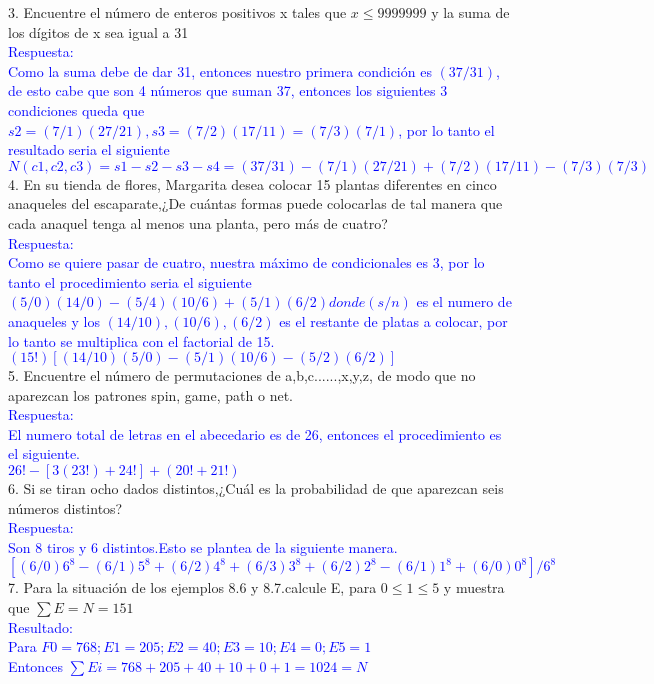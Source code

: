 \documentclass{article}
\begin{document}
3. Encuentre el número de enteros positivos x tales que $x\leq 9999999$ y la suma de los dígitos de x sea igual a 31\\
\textcolor{blue}{ Respuesta:\\Como la suma debe de dar 31, entonces nuestro primera condición es $(37/31)$, de esto cabe que son 4 números que suman 37, entonces los siguientes 3 condiciones queda que $s2=(7/1)(27/21), s3=(7/2)(17/11)=(7/3)(7/1)$, por lo tanto el resultado seria el siguiente\\$N(c1,c2,c3)=s1-s2-s3-s4=(37/31)-(7/1)(27/21)+(7/2)(17/11)-(7/3)(7/3)$
}
\\
4. En su tienda de flores, Margarita desea colocar 15 plantas diferentes en cinco anaqueles del escaparate,¿De cuántas formas puede colocarlas de tal manera que cada anaquel tenga al menos una planta, pero más de cuatro?\\
\textcolor{blue}{Respuesta:\\Como se quiere pasar de cuatro, nuestra máximo de condicionales es 3, por lo tanto el procedimiento seria el siguiente\\
$(5/0)(14/0)-(5/4)(10/6)+(5/1)(6/2) donde (s/n)$ es el numero de anaqueles y los $(14/10),(10/6),(6/2)$ es el restante de platas a colocar, por lo tanto se multiplica con el factorial de 15.\\$(15!)[(14/10)(5/0)-(5/1)(10/6)-(5/2)(6/2)]$
}
\\
5. Encuentre el número de permutaciones de a,b,c......,x,y,z, de modo que no aparezcan los patrones spin, game, path o net.\\
\textcolor{blue}{Respuesta:\\El numero total de letras en el abecedario es de 26, entonces el procedimiento es el siguiente.\\
$26!-[3(23!)+24!]+(20!+21!)$
}
\\
6. Si se tiran ocho dados distintos,¿Cuál es la probabilidad de que aparezcan seis números distintos?\\
\textcolor{blue}{Respuesta:\\Son 8 tiros y 6 distintos.Esto se plantea de la siguiente manera.\\$[(6/0)6^8-(6/1)5^8+(6/2)4^8+(6/3)3^8+(6/2)2^8-(6/1)1^8+(6/0)0^8]/6^8$
}
\\
7. Para la situación de los ejemplos 8.6 y 8.7.calcule E, para $0\leq 1 \leq 5$ y muestra que $\sum E=N=151$\\
\textcolor{blue}{Resultado:\\Para $F0=768; E1=205; E2=40; E3=10; E4=0; E5=1$\\Entonces $\sum Ei=768+205+40+10+0+1=1024=N$
}
\end{document}
